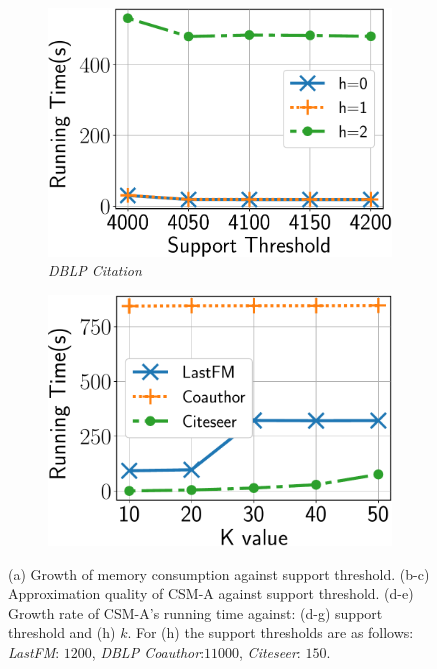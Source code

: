 \begin{figure}
\begin{subfigure}[b]{0.25\textwidth}
		\includegraphics[scale=0.24, angle=0]{img2/citationdblp/citationdblp_running_time_nobound.pdf}
		\caption{{\em DBLP Citation}}
		\label{fig:citation_nosb}
	\end{subfigure}%
	\begin{subfigure}[b]{0.25\textwidth}
		\includegraphics[keepaspectratio,scale=0.25]{img2/lastfm/lastfm_K_var_fnl.pdf}
		\caption{}
		\label{fig:lastfm_k}
	\end{subfigure}%
	\caption{(a) Growth of memory consumption against support threshold. (b-c) Approximation quality of {\sf CSM-A} against support threshold. (d-e) Growth rate of {\sf CSM-A}'s running time against: (d-g) support threshold and (h) $k$. For (h) the support thresholds are as follows: {\em LastFM}: $1200$, {\em DBLP Coauthor}:$11000$, {\em Citeseer}: $150$. }
	\label{fig:quality}
	\vspace{-1mm}
\end{figure}
%
\vspace{-0.1in}
